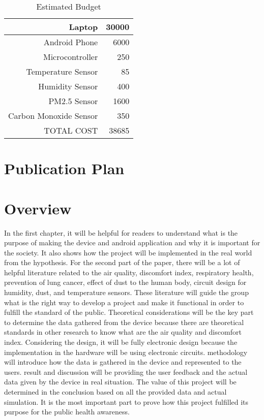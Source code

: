 \begin{table}[htbp]
  \centering
  \caption{Estimated Budget}
    \begin{tabular}{rr}
    \toprule
    Laptop & 30000 \\
    \midrule
    Android Phone & 6000 \\
    Microcontroller & 250 \\
    Temperature Sensor & 85 \\
    Humidity Sensor & 400 \\
    PM2.5 Sensor & 1600 \\
    Carbon Monoxide Sensor & 350 \\
    TOTAL COST & 38685 \\
    \bottomrule
    \end{tabular}%
  \label{tab:addlabel}%
\end{table}%

\ifFinished
\else


\section{Publication Plan}
\blindtext

\fi


\section{Overview}

In the first chapter, it will be helpful for readers to understand what is the purpose of making the device and android application and why it is important for the society. It also shows how the project will be implemented in the real world from the hypothesis. For the second part of the paper, there will be a lot of helpful literature related to the air quality, discomfort index, respiratory health, prevention of lung cancer, effect of dust to the human body, circuit design for humidity, dust, and temperature sensors. These literature will guide the group what is the right way to develop a project and make it functional in order to fulfill the standard of the public. Theoretical considerations will be the key part to determine the data gathered from the device because there are theoretical standards in other research to know what are the air quality and discomfort index. Considering the design, it will be fully electronic design because the implementation in the hardware will be using electronic circuits. methodology will introduce how the data is gathered in the device and represented to the users. result and discussion will be providing the user feedback and the actual data given by the device in real situation. The value of this project will be determined in the conclusion based on all the provided data and actual simulation. It is the most important part to prove how this project fulfilled its purpose for the public health awareness.

